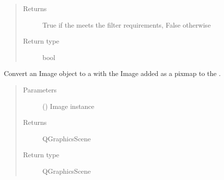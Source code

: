 \documentclass[letterpaper,10pt,english]{sphinxmanual}
\begin{document}
\begin{fulllineitems}
\begin{fulllineitems}
\begin{quote}
\begin{description}
\begin{itemize}
\end{itemize}

\item[{Returns}] \leavevmode
True if the
{\hyperref[\detokenize{polo.crystallography:polo.crystallography.image.Image}]{}}
meets the filter requirements, False otherwise

\item[{Return type}] \leavevmode
bool

\end{description}\end{quote}

\end{fulllineitems}


\begin{fulllineitems}
\label{\detokenize{polo.crystallography:polo.crystallography.image.Image.to_graphics_scene}}
Convert an Image object to a  with
the Image added as a pixmap to the .
\begin{quote}\begin{description}
\item[{Parameters}] \leavevmode
{} ({\hyperref[\detokenize{polo.crystallography:polo.crystallography.image.Image}]{}}) \textendash{} Image instance

\item[{Returns}] \leavevmode
QGraphicsScene

\item[{Return type}] \leavevmode
QGraphicsScene

\end{description}\end{quote}

\end{fulllineitems}



\end{fulllineitems}
\end{document}
